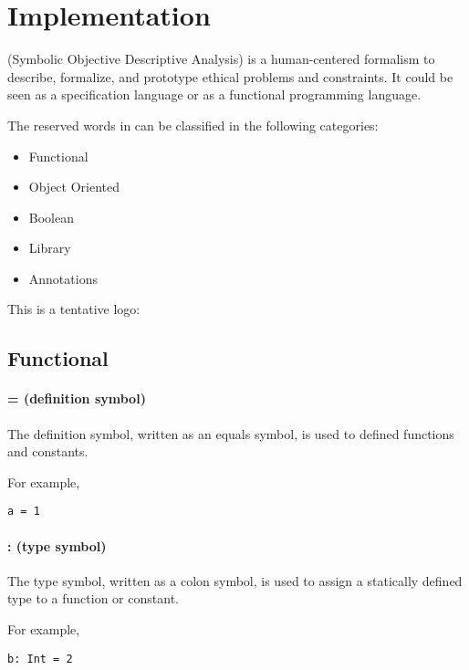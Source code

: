 \chapter{Implementation}

\Soda (Symbolic Objective Descriptive Analysis) is a human-centered formalism to describe, formalize, and prototype ethical problems and constraints.
It could be seen as a specification language or as a functional programming language.

The reserved words in \Soda can be classified in the following categories:

\begin{itemize}
    \item Functional
    \item Object Oriented
    \item Boolean
    \item Library
    \item Annotations
\end{itemize}



This is a tentative logo:

\Sodalogo


\section{Functional}

\subsubsection{= (definition symbol)}

The definition symbol, written as an equals symbol, is used to defined functions and constants.

For example,
\begin{lstlisting}[label={lst:exampleDef}]
  a = 1
\end{lstlisting}

\subsubsection{: (type symbol)}

The type symbol, written as a colon symbol, is used to assign a statically defined type to a function or constant.

For example,
\begin{lstlisting}[label={lst:exampleType01}]
  b: Int = 2
\end{lstlisting}

